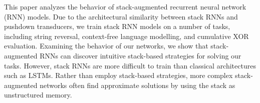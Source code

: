 This paper analyzes the behavior of stack-augmented recurrent neural network (RNN) models. Due to the architectural similarity between stack RNNs and pushdown transducers, we train stack RNN models on a number of tasks, including string reversal, context-free language modelling, and cumulative XOR evaluation. Examining the behavior of our networks, we show that stack-augmented RNNs can discover intuitive stack-based strategies for solving our tasks. However, stack RNNs are more difficult to train than classical architectures such as LSTMs. Rather than employ stack-based strategies, more complex stack-augmented networks often find approximate solutions by using the stack as unstructured memory.
